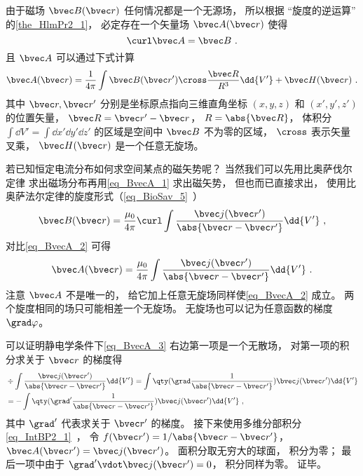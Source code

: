 
\begin{issues}
\issueDraft
{}
\end{issues}


由于磁场 $\bvec B(\bvec r)$ 任何情况都是一个无源场， 所以根据 “旋度的逆运算” 的\autoref{the_HlmPr2_1}， 必定存在一个矢量场 $\bvec A(\bvec r)$ 使得
\begin{equation}\label{eq_BvecA_2}
\curl \bvec A = \bvec B~.
\end{equation}
且 $\bvec A$ 可以通过下式计算
\begin{equation}\label{eq_BvecA_1}
\bvec A(\bvec r) = \frac{1}{4\pi} \int \bvec B(\bvec r') \cross \frac{\bvec R}{R^3} \dd{V'} + \bvec H(\bvec r)~.
\end{equation}
其中 $\bvec r, \bvec r'$ 分别是坐标原点指向三维直角坐标 $(x, y, z)$ 和 $(x', y', z')$ 的位置矢量， $\bvec R = \bvec r' - \bvec r$， $R = \abs{\bvec R}$， 体积分 $\int\dd{V'} = \int\dd{x'}\dd{y'}\dd{z'}$ 的区域是空间中 $\bvec B$ 不为零的区域， $\cross$ 表示矢量叉乘， $\bvec H(\bvec r)$ 是一个任意无旋场。

若已知恒定电流分布如何求空间某点的磁矢势呢？ 当然我们可以先用比奥萨伐尔定律 求出磁场分布再用\autoref{eq_BvecA_1} 求出磁矢势， 但也而已直接求出， 使用比奥萨法尔定律的旋度形式（\autoref{eq_BioSav_5}~）
\begin{equation}
\bvec B(\bvec r) = \frac{\mu_0}{4\pi} \curl \int \frac{\bvec j(\bvec r')}{\abs{\bvec r - \bvec r'}}\dd{V'}~,
\end{equation}
对比\autoref{eq_BvecA_2} 可得
\begin{equation}\label{eq_BvecA_3}
\bvec A(\bvec r) = \frac{\mu_0}{4\pi} \int \frac{\bvec j(\bvec r')}{\abs{\bvec r - \bvec r'}}\dd{V'}~.
\end{equation}
注意 $\bvec A$ 不是唯一的， 给它加上任意无旋场同样使\autoref{eq_BvecA_2} 成立。 两个旋度相同的场只可能相差一个无旋场。 无旋场也可以记为任意函数的梯度 $\grad \varphi$。

可以证明静电学条件下\autoref{eq_BvecA_3} 右边第一项是一个无散场， 对第一项的积分求关于 $\bvec r$ 的梯度得
\begin{equation}
\begin{aligned}
&\div \int \frac{\bvec j(\bvec r')}{\abs{\bvec r - \bvec r'}}\dd{V'} = 
\int \qty(\grad\frac{1}{\abs{\bvec r - \bvec r'}}) \bvec j(\bvec r') \dd{V'}\\
&= -\int \qty(\grad' \frac{1}{\abs{\bvec r - \bvec r'}}) \bvec j(\bvec r') \dd{V'}~,
\end{aligned}
\end{equation}
其中 $\grad'$ 代表求关于 $\bvec r'$ 的梯度。 接下来使用多维分部积分\autoref{eq_IntBP2_1}~， 令 $f(\bvec r') = 1/\abs{\bvec r - \bvec r'}$， $\bvec A(\bvec r') = \bvec j(\bvec r')$。 面积分取无穷大的球面， 积分为零； 最后一项中由于 $\grad' \vdot \bvec j(\bvec r') = 0$， 积分同样为零。 证毕。

